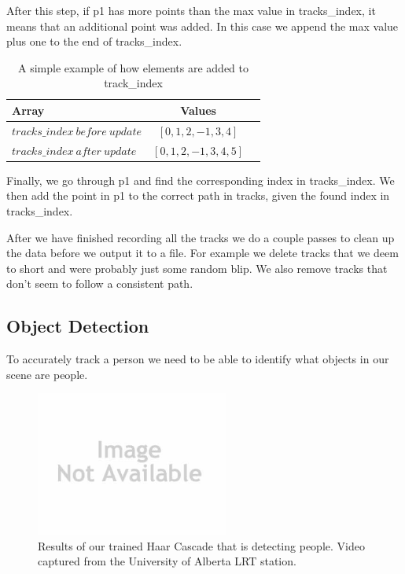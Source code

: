 \documentclass[conference]{IEEEtran}
\begin{document}
After this step, if p1 has more points than the max value in tracks\_index, it means that an additional point was added. In this case we append the max value plus one to the end of tracks\_index.

\begin{table}[!t]
\caption{A simple example of how elements are added to track\_index}
\label{table_index_add}
\centering
\begin{tabular}{ | l | c | r | }
 \hline
 Array & Values\\
  \hline\hline                     
  $tracks\_index\ before\ update$ & $[0, 1, 2, -1, 3, 4]$ \\
  \hline
  $tracks\_index\ after\ update$ & $[0, 1, 2, -1, 3, 4, 5]$ \\
  \hline  
\end{tabular}
\end{table}

Finally, we go through p1 and find the corresponding index in tracks\_index. We then add the point in p1 to the correct path in tracks, given the found index in tracks\_index.

After we have finished recording all the tracks we do a couple passes to clean up the data before we output it to a file. For example we delete tracks that we deem to short and were probably just some random blip. We also remove tracks that don’t seem to follow a consistent path.

\subsection{Object Detection}

To accurately track a person we need to be able to identify what objects in our scene are people.

\begin{figure}[!t]
\centering
\includegraphics[width=2.5in]{noImage.jpg}
\caption{Results of our trained Haar Cascade that is detecting people. Video captured from the University of Alberta LRT station.}
\label{Object_Detection}
\end{figure}
\end{document}

